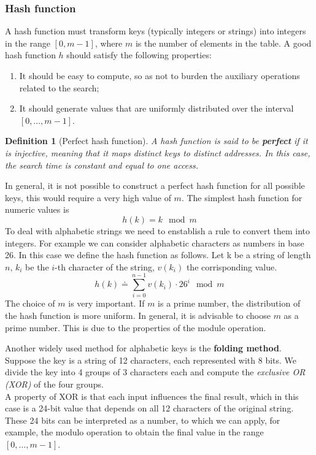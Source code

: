\documentclass{report}
\newtheorem{defin}{Definition}[chapter]
\begin{document}
\subsubsection{Hash function}
A hash function must transform keys (typically integers or strings) into integers in the range $[0, m - 1]$, where $m$ is the number of elements in the table. A good hash function $h$ should satisfy the following properties:
\begin{enumerate}
    \item It should be easy to compute, so as not to burden the auxiliary operations related to the search;
    \item It should generate values that are uniformly distributed over the interval $[0, \dots, m - 1]$.
\end{enumerate}
\begin{defin}[Perfect hash function]
    A hash function is said to be \textbf{perfect} if it is injective, meaning that it maps distinct keys to distinct addresses. In this case, the search time is constant and equal to one access. 
\end{defin}
\noindent In general, it is not possible to construct a perfect hash function for all possible keys, this would require a very high value of \(m\). The simplest hash function for numeric values is 
\begin{equation}
    h(k) = k \mod m
\end{equation}
\noindent To deal with alphabetic strings we need to enstablish a rule to convert them into integers. For example we can consider alphabetic characters as numbers in base 26. In this case we define the hash function as follows. Let k be a string of length \(n\), \(k_i\) be the \(i\)-th character of the string, \(v(k_i)\) the corrisponding value.
\begin{equation}
    h(k) \doteq \sum_{i=0}^{n-1} v(k_i) \cdot 26^i \mod m
\end{equation}
\noindent The choice of \(m\) is very important. If \(m\) is a prime number, the distribution of the hash function is more uniform. In general, it is advisable to choose \(m\) as a prime number. This is due to the properties of the module operation.

Another widely used method for alphabetic keys is the \textbf{{folding} method}. Suppose the key is a string of 12 characters, each represented with 8 bits. We divide the key into 4 groups of 3 characters each and compute the \textit{exclusive OR (XOR)} of the four groups.
\\ A property of XOR is that each input influences the final result, which in this case is a 24-bit value that depends on all 12 characters of the original string. These 24 bits can be interpreted as a number, to which we can apply, for example, the modulo operation to obtain the final value in the range $[0, \dots, m - 1]$.
\end{document}
